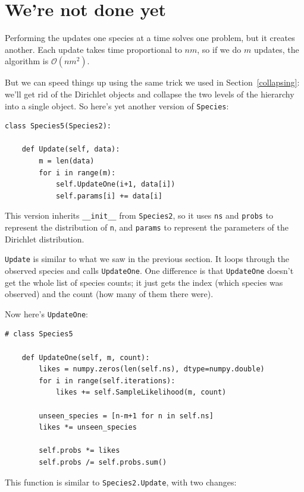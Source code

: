 \documentclass[12pt]{book}
\begin{document}
\section{We're not done yet}

\newcommand{\BigO}[1]{\mathcal{O}(#1)}

Performing the updates one species at a time solves one problem, but
it creates another.  Each update takes time proportional to $n m$,
so if we do $m$ updates, the algorithm is $\BigO{n m^2}$. 

But we can speed things up using the same trick we used in
Section~\ref{collapsing}: we'll get rid of the Dirichlet objects and
collapse the two levels of the hierarchy into a single object.  So
here's yet another version of {\tt Species}:

\begin{verbatim}
class Species5(Species2):
    
    def Update(self, data):
        m = len(data)
        for i in range(m):
            self.UpdateOne(i+1, data[i])
            self.params[i] += data[i]
\end{verbatim}

This version inherits \verb"__init__" from {\tt Species2}, so
it uses {\tt ns} and {\tt probs} to represent the distribution
of {\tt n}, and {\tt params} to represent the parameters of
the Dirichlet distribution.

{\tt Update} is similar to what we saw in the previous section.
It loops through the observed species and calls {\tt UpdateOne}.
One difference is that {\tt UpdateOne} doesn't get the whole list
of species counts; it just gets the index (which species was
observed) and the count (how many of them there were).

Now here's {\tt UpdateOne}:

\begin{verbatim}
# class Species5

    def UpdateOne(self, m, count):
        likes = numpy.zeros(len(self.ns), dtype=numpy.double)
        for i in range(self.iterations):
            likes += self.SampleLikelihood(m, count)

        unseen_species = [n-m+1 for n in self.ns]
        likes *= unseen_species

        self.probs *= likes
        self.probs /= self.probs.sum()
\end{verbatim}

This function is similar to {\tt Species2.Update}, with two changes:
\end{document}
